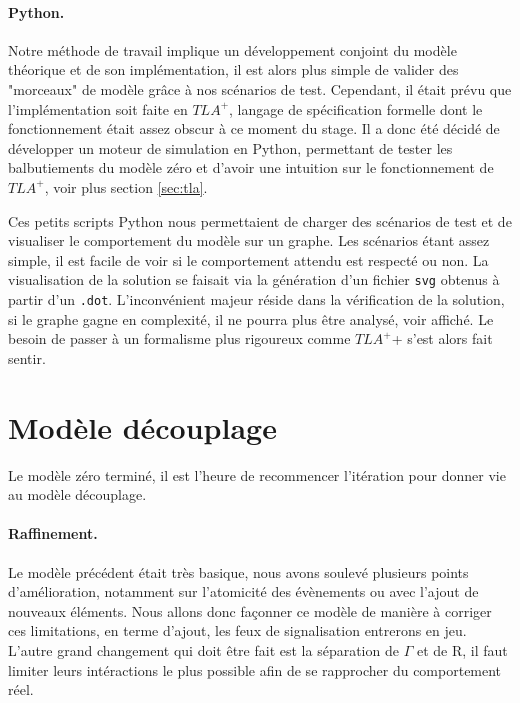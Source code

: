 \documentclass[oneside, a4paper, 11pt]{book}
\newcommand{\TLA}{\ensuremath{TLA^+}}
\newcommand{\trainFmt}[1]{{\color{traincolor} #1}}
\begin{document}
\paragraph{Python.}
Notre méthode de travail implique un développement conjoint du modèle théorique et de son implémentation, il est alors plus simple de valider des "morceaux" de modèle grâce à nos scénarios de test.
Cependant, il était prévu que l'implémentation soit faite en \TLA, langage de spécification formelle dont le fonctionnement était assez obscur à ce moment du stage.
Il a donc été décidé de développer un moteur de simulation en Python, permettant de tester les balbutiements du modèle zéro et d'avoir une intuition sur le fonctionnement de \TLA, voir plus section \ref{sec:tla}.


\begin{figure}
\end{figure}
\noindent
Ces petits scripts Python nous permettaient de charger des scénarios de test et de visualiser le comportement du modèle sur un graphe. Les scénarios étant assez simple, il est facile de voir si le comportement attendu est respecté ou non.
La visualisation de la solution se faisait via la génération d'un fichier \texttt{svg} obtenus à partir d'un \texttt{.dot}. L'inconvénient majeur réside dans la vérification de la solution, si le graphe gagne en complexité, il ne pourra plus être analysé, voir affiché.
Le besoin de passer à un formalisme plus rigoureux comme \TLA+ s'est alors fait sentir.












\section{Modèle découplage}

Le modèle zéro terminé, il est l'heure de recommencer l'itération pour donner vie au modèle découplage.

\paragraph{Raffinement.} Le modèle précédent était très basique, nous avons soulevé plusieurs points d'amélioration, notamment sur l'atomicité des évènements ou avec l'ajout de nouveaux éléments. Nous allons donc façonner ce modèle de manière à corriger ces limitations, en terme d'ajout, les feux de signalisation entrerons en jeu.
L'autre grand changement qui doit être fait est la séparation de \trainFmt{$\Gamma$} et de R, il faut limiter leurs intéractions le plus possible afin de se rapprocher du comportement réel.
\end{document}

